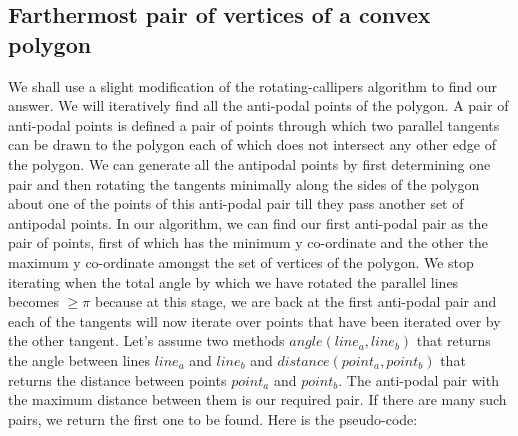 \documentclass{article}
\begin{document}
\subsection{Farthermost pair of vertices of a convex polygon}
We shall use a slight modification of the rotating-callipers algorithm to find our answer. We will iteratively find all the anti-podal points of the polygon. A pair of anti-podal points is defined a pair of points through which two parallel tangents can be drawn to the polygon each of which does not intersect any other edge of the polygon. We can generate all the antipodal points by first determining one pair and then rotating the tangents minimally along the sides of the polygon about one of the points of this anti-podal pair till they pass another set of antipodal points. In our algorithm, we can find our first anti-podal pair as the pair of points, first of which has the minimum y co-ordinate and the other the maximum y co-ordinate amongst the set of vertices of the polygon. We stop iterating when the total angle by which we have rotated the parallel lines becomes $\geq \pi$ because at this stage, we are back at the first anti-podal pair and each of the tangents will now iterate over points that have been iterated over by the other tangent. Let's assume two methods $angle(line_a, line_b)$ that returns the angle between lines $line_a$ and $line_b$ and $distance(point_a, point_b)$ that returns the distance between points $point_a$ and $point_b$. The anti-podal pair with the maximum distance between them is our required pair. If there are many such pairs, we return the first one to be found. 
\newline Here is the pseudo-code:
\newline
\end{document}
